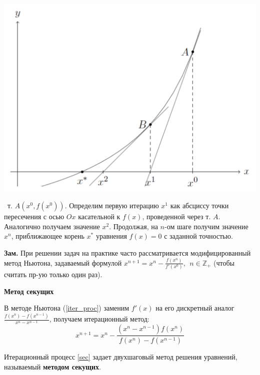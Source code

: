\includegraphics[scale=0.4]{pics/osn_30_0.png}

\faEye \ т. $A(x^0,f(x^0))$. Определим первую итерацию $x^1$ как абсциссу точки пересечения с осью $Ox$ касательной к $f(x)$, проведенной через т. $A$. Аналогично получаем значение $x^2$. Продолжая, на $n$-ом шаге получим значение $x^n$, приближающее корень $x^*$ уравнения $f(x)=0$ с заданной точностью.

\textbf{Зам.} При решении задач на практике часто рассматривается модифицированный
метод Ньютона, задаваемый формулой $ x^{n + 1} = x^n - \frac{f(x^n)}{f'(x^0)},~~n\in\mathbb{Z_+}$ (чтобы считать пр-ую только один раз).

\centerline{\textbf{Метод секущих}}

В методе Ньютона (\ref{iter_proc}) заменим $f'(x)$ на его дискретный аналог $\frac{f(x^n)-f(x^{n-1})}{x^n-x^{n-1}}$, получаем итерационный метод:
\begin{equation}
    x^{n+1} = x^n - \frac{(x^n - x^{n-1})f(x^n)}{f(x^n) - f(x^{n-1})}
    \label{sec}
\end{equation}
  
Итерационный процесс \ref{sec} задает двухшаговый метод решения уравнений, называемый \textbf{методом секущих}.

